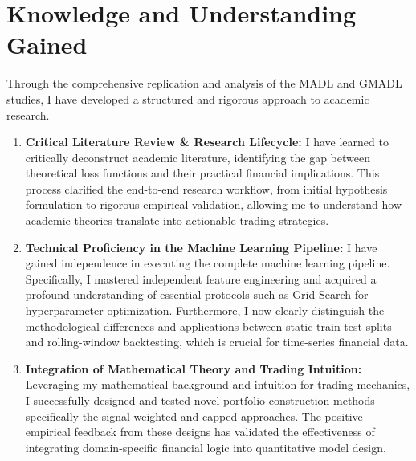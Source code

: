 \documentclass[openany]{book}
\numberwithin{figure}{chapter}
\numberwithin{equation}{chapter}
\begin{document}
\section{Knowledge and Understanding Gained}
Through the comprehensive replication and analysis of the MADL and GMADL studies, I have developed a structured and rigorous approach to academic research.
\begin{enumerate}
    \item \textbf{Critical Literature Review \& Research Lifecycle:}
    I have learned to critically deconstruct academic literature, identifying the gap between theoretical loss functions and their practical financial implications. This process clarified the end-to-end research workflow, from initial hypothesis formulation to rigorous empirical validation, allowing me to understand how academic theories translate into actionable trading strategies.
    
    \item \textbf{Technical Proficiency in the Machine Learning Pipeline:}
    I have gained independence in executing the complete machine learning pipeline. Specifically, I mastered independent feature engineering and acquired a profound understanding of essential protocols such as Grid Search for hyperparameter optimization. Furthermore, I now clearly distinguish the methodological differences and applications between static train-test splits and rolling-window backtesting, which is crucial for time-series financial data.
    
    \item \textbf{Integration of Mathematical Theory and Trading Intuition:}
    Leveraging my mathematical background and intuition for trading mechanics, I successfully designed and tested novel portfolio construction methods—specifically the signal-weighted and capped approaches. The positive empirical feedback from these designs has validated the effectiveness of integrating domain-specific financial logic into quantitative model design.
\end{enumerate}
\end{document}
